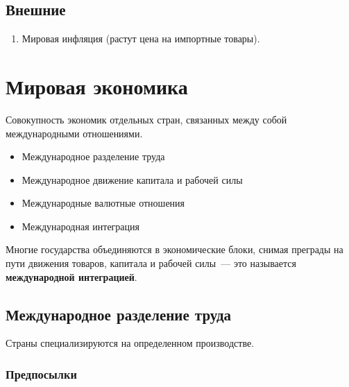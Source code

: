 \documentclass[12pt]{article}
\begin{document}
    \subsection{Внешние}

    \begin{enumerate}
        \item Мировая инфляция (растут цена на импортные товары).
    \end{enumerate}
    
    \section{Мировая экономика}
    
    \begin{definition}
    	Совокупность экономик отдельных стран, связанных между собой международными отношениями.
    \end{definition}
    
    \begin{itemize}
    	\item Международное разделение труда
    	\item Международное движение капитала и рабочей силы
    	\item Международные валютные отношения
    	\item Международная интеграция
    \end{itemize}
    
    \noindent
    Многие государства объединяются в экономические блоки, снимая преграды на пути движения товаров, капитала и рабочей силы~--- это называется \textbf{международной интеграцией}.
    
    \subsection{Международное разделение труда}
    
    \begin{definition}
    	Страны специализируются на определенном производстве.
    \end{definition}
    
    \subsubsection{Предпосылки}
    
\end{document}
